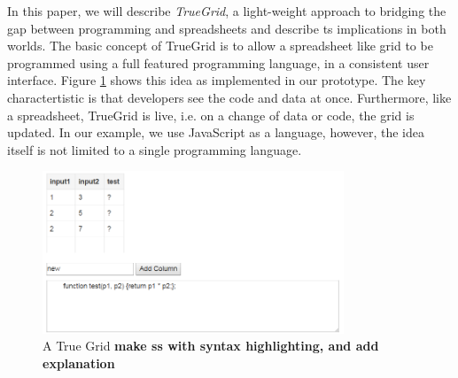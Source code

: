 \documentclass{llncs}
\newcommand{\todo}[1]{\textbf{#1}}
\begin{document}


 
In this paper, we will describe \textit{TrueGrid}, a light-weight approach to bridging the gap between programming and spreadsheets and describe ts implications in both worlds. The basic concept of TrueGrid is to allow a spreadsheet like grid to be programmed using a full featured programming language, in a consistent user interface. Figure \ref{fig:TG} shows this idea as implemented in our prototype. 
The key charactertistic is that  developers see the code and data at once. Furthermore, like a spreadsheet, TrueGrid is live, i.e. on a change of data or code, the grid is updated.
In our example, we use JavaScript as a language, however, the idea itself is not limited to a single programming language.

\begin{figure}
  \begin{center}
  \includegraphics[width=9cm]{fig/TG.png}
  \caption{A True Grid \todo{make ss with syntax highlighting, and add explanation}}
  \label{fig:TG}
  \end{center}
\end{figure} 
\end{document}
